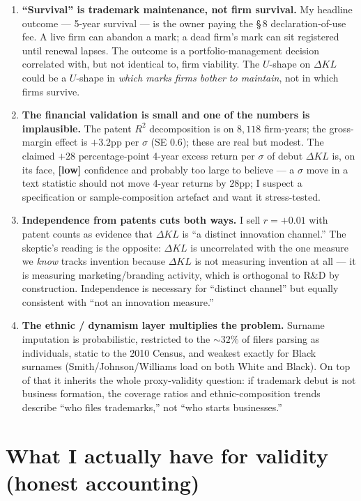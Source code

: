 \documentclass[11pt]{article}
\newcommand{\dkl}{\Delta KL}
\begin{document}
\begin{enumerate}[leftmargin=*]
\item \textbf{``Survival'' is trademark maintenance, not firm
survival.} My headline outcome --- 5-year survival --- is the owner
paying the \S\,8 declaration-of-use fee. A live firm can abandon a
mark; a dead firm's mark can sit registered until renewal lapses.
The outcome is a portfolio-management decision correlated with, but
not identical to, firm viability. The $U$-shape on $\dkl$ could be a
$U$-shape in \emph{which marks firms bother to maintain}, not in
which firms survive.

\item \textbf{The financial validation is small and one of the
numbers is implausible.} The patent $R^2$ decomposition is on
$8{,}118$ firm-years; the gross-margin effect is $+3.2$pp per
$\sigma$ (SE $0.6$); these are real but modest. The claimed
$+28$ percentage-point 4-year excess return per $\sigma$ of debut
$\dkl$ is, on its face, \textbf{[low]} confidence and probably too
large to believe --- a $\sigma$ move in a text statistic should not
move 4-year returns by $28$pp; I suspect a specification or
sample-composition artefact and want it stress-tested.

\item \textbf{Independence from patents cuts both ways.} I sell
$r = +0.01$ with patent counts as evidence that $\dkl$ is ``a
distinct innovation channel.'' The skeptic's reading is the
opposite: $\dkl$ is uncorrelated with the one measure we
\emph{know} tracks invention because $\dkl$ is not measuring
invention at all --- it is measuring marketing/branding activity,
which is orthogonal to R\&D by construction. Independence is
necessary for ``distinct channel'' but equally consistent with
``not an innovation measure.''

\item \textbf{The ethnic / dynamism layer multiplies the problem.}
Surname imputation is probabilistic, restricted to the $\sim 32\%$
of filers parsing as individuals, static to the 2010 Census, and
weakest exactly for Black surnames (Smith/Johnson/Williams load on
both White and Black). On top of that it inherits the whole
proxy-validity question: if trademark debut is not business
formation, the coverage ratios and ethnic-composition trends
describe ``who files trademarks,'' not ``who starts businesses.''
\end{enumerate}

\section{What I actually have for validity (honest accounting)}
\end{document}
